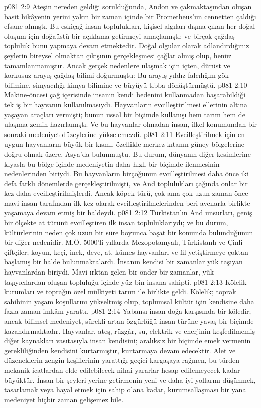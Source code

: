 \vs p081 2:9 Ateşin nereden geldiği sorulduğunda, Andon ve çakmaktaşından oluşan basit hikâyenin yerini yakın bir zaman içinde bir Prometheus’un cennetten çaldığı efsane almıştı. Bu eskiçağ insan toplulukları, kişisel algıları dışına çıkan her doğal oluşum için doğaüstü bir açıklama getirmeyi amaçlamıştı; ve birçok çağdaş topluluk bunu yapmaya devam etmektedir. Doğal olgular olarak adlandırdığınız şeylerin bireysel olmaktan çıkışının gerçekleşmesi çağlar almış olup, henüz tamamlanmamıştır. Ancak gerçek nedenlere ulaşmak için içten, dürüst ve korkusuz arayış çağdaş bilimi doğurmuştu: Bu arayış yıldız falcılığını gök bilimine, simyacılığı kimya bilimine ve büyüyü tıbba dönüştürmüştü.
\vs p081 2:10 Makine\hyp{}öncesi çağ içerisinde insanın kendi bedenini kullanmadan başarabildiği tek iş bir hayvanın kullanılmasıydı. Hayvanların evcilleştirilmesi ellerinin altına yaşayan araçları vermişti; bunun ussal bir biçimde kullanışı hem tarım hem de ulaşıma zemin hazırlamıştı. Ve bu hayvanlar olmadan insan, ilkel konumundan bir sonraki medeniyet düzeylerine yükselemezdi.
\vs p081 2:11 Evcilleştirilmek için en uygun hayvanların büyük bir kısmı, özellikle merkez kıtanın güney bölgelerine doğru olmak üzere, Asya’da bulunmuştu. Bu durum, dünyanın diğer kesimlerine kıyasla bu bölge içinde medeniyetin daha hızlı bir biçimde ilenmesinin nedenlerinden biriydi. Bu hayvanların birçoğunun evcilleştirilmesi daha önce iki defa farklı dönemlerde gerçekleştirilmişti, ve And toplulukları çağında onlar bir kez daha evcilleştirilmişlerdi. Ancak köpek türü, çok ama çok uzun zaman önce mavi insan tarafından ilk kez olarak evcilleştirilmelerinden beri avcılarla birlikte yaşamaya devam etmiş bir haldeydi.
\vs p081 2:12 Türkistan’ın And unsurları, geniş bir ölçekte at türünü evcilleştiren ilk insan topluluklarıydı; ve bu durum, kültürlerinin neden çok uzun bir süre boyunca başat bir konumda bulunduğunun bir diğer nedenidir. M.Ö. 5000’li yıllarda Mezopotamyalı, Türkistanlı ve Çinli çiftçiler; koyun, keçi, inek, deve, at, kümes hayvanları ve fil yetiştirmeye çoktan başlamış bir halde bulunmaktalardı. İnsanın kendisi bir zamanlar yük taşıyan hayvanlardan biriydi. Mavi ırktan gelen bir önder bir zamanlar, yük taşıyıcılardan oluşan topluluğu içinde yüz bin insana sahipti.
\vs p081 2:13 Kölelik kurumları ve toprağın özel mülkiyeti tarım ile birlikte geldi. Kölelik; toprak sahibinin yaşam koşullarını yükseltmiş olup, toplumsal kültür için kendisine daha fazla zaman imkânı yarattı.
\vs p081 2:14 Yabansı insan doğa karşısında bir köledir; ancak bilimsel medeniyet, sürekli artan özgürlüğü insan türüne yavaş bir biçimde kazandırmaktadır. Hayvanlar, ateş, rüzgâr, su, elektrik ve enerjinin keşfedilmemiş diğer kaynakları vasıtasıyla insan kendisini; aralıksız bir biçimde emek vermenin gerekliliğinden kendisini kurtarmıştır, kurtarmaya devam edecektir. Alet ve düzeneklerin zengin keşiflerinin yarattığı geçici kargaşaya rağmen, bu türden mekanik icatlardan elde edilebilecek nihai yararlar hesap edilemeyecek kadar büyüktür. İnsan bir şeyleri yerine getirmenin yeni ve daha iyi yollarını düşünmek, tasarlamak veya hayal etmek için  sahip olana kadar, kurumsallaşması bir yana medeniyet hiçbir zaman gelişemez bile.
